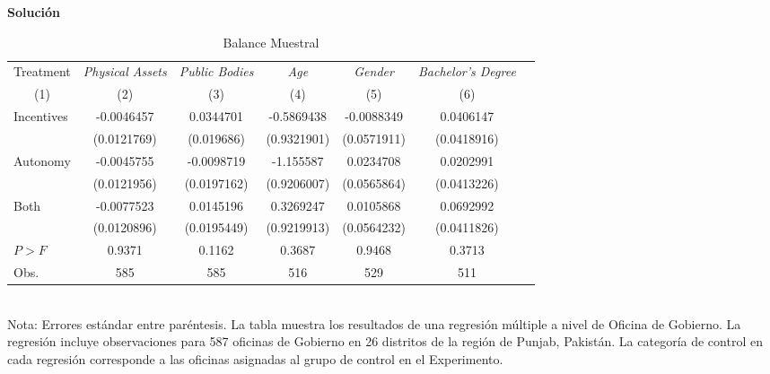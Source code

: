 \documentclass[a4paper, answers, addpoints, 11pt]{exam}
\newenvironment{solucion}{%
  \begin{mdframed}[
    backgroundcolor=blue!5,    %
    linecolor=blue!50,          %
    linewidth=2pt,              %
    leftmargin=10pt,            %
    rightmargin=10pt,           %
    topline=true,              %
    bottomline=true,            %
    roundcorner=10pt,           %
    innerleftmargin=10pt,       %
    innerrightmargin=10pt,      %
    innerbottommargin=10pt,     %
    innertopmargin=10pt         %
  ]%
  \begin{tcolorbox}[colframe=blue!50!black, colback=blue!50, coltitle=white, sharp corners=all, boxrule=1mm, width=\textwidth, halign=left, valign=center, top=0mm, bottom=0mm, left=0mm, right=0mm] \textbf{Solución} \end{tcolorbox} }{\end{mdframed}}
\begin{document}
\begin{enumerate}
\begin{solucion}
\begin{table}[H]
	\centering
	\caption{Balance Muestral}
	\label{tab2:balancetemplacte}
	\begin{tabular}{lcccccc}
		\toprule
		\multicolumn{1}{c}{Treatment} & \multicolumn{1}{c}{\textit{Physical Assets}} & \multicolumn{1}{c}{\textit{Public Bodies}} & \multicolumn{1}{c}{\textit{Age}} & \multicolumn{1}{c}{\textit{Gender}} & \multicolumn{1}{c}{\textit{Bachelor's Degree}}  \\
		\multicolumn{1}{c}{(1)} & (2) & (3) & (4) & (5) & (6) \\ \toprule
		  \addlinespace 
		Incentives &  -0.0046457 &  0.0344701 & -0.5869438 & -0.0088349 & 0.0406147 \\
		& (0.0121769) & (0.019686) & (0.9321901) & (0.0571911) & (0.0418916) \\
		Autonomy & -0.0045755 & -0.0098719 & -1.155587 & 0.0234708 & 0.0202991 \\
		& (0.0121956) & (0.0197162) & (0.9206007) & (0.0565864) & (0.0413226) \\
		Both & -0.0077523 & 0.0145196 & 0.3269247 & 0.0105868 & 0.0692992 \\
		& (0.0120896) & (0.0195449) & (0.9219913) & (0.0564232) & (0.0411826) \\ \midrule
		$P>F$ & 0.9371 & 0.1162 & 0.3687 & 0.9468 & 0.3713 \\
		Obs. & 585 & 585 & 516 & 529 & 511 \\ \bottomrule
	\end{tabular}
	{\footnotesize{\\Nota: Errores estándar entre paréntesis. La tabla muestra los resultados de una regresión múltiple a nivel de Oficina de Gobierno. La regresión incluye observaciones para 587 oficinas de Gobierno en 26 distritos de la región de Punjab, Pakistán. La categoría de control en cada regresión corresponde a las oficinas asignadas al grupo de control en el Experimento.}}
\end{table}


\end{solucion}
\end{enumerate}
\end{document}
